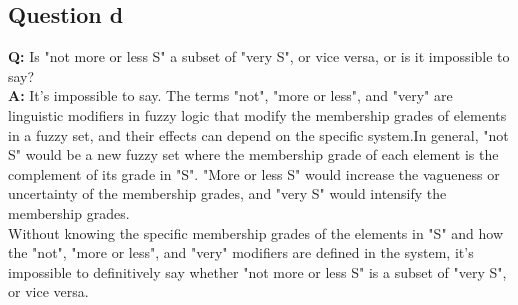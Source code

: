 \subsection{Question d}
\textbf{Q: }Is "not more or less S" a subset of "very S", or vice versa, or is it impossible to say?\\
\textbf{A: } It's impossible to say. The terms "not", "more or less", and "very" are linguistic modifiers in fuzzy logic that modify the membership grades of elements in a fuzzy set, and their effects can depend on the specific system.In general, "not S" would be a new fuzzy set where the membership grade of each element is the complement of its grade in "S". "More or less S" would increase the vagueness or uncertainty of the membership grades, and "very S" would intensify the membership grades.\\
Without knowing the specific membership grades of the elements in "S" and how the "not", "more or less", and "very" modifiers are defined in the system, it's impossible to definitively say whether "not more or less S" is a subset of "very S", or vice versa.



	





